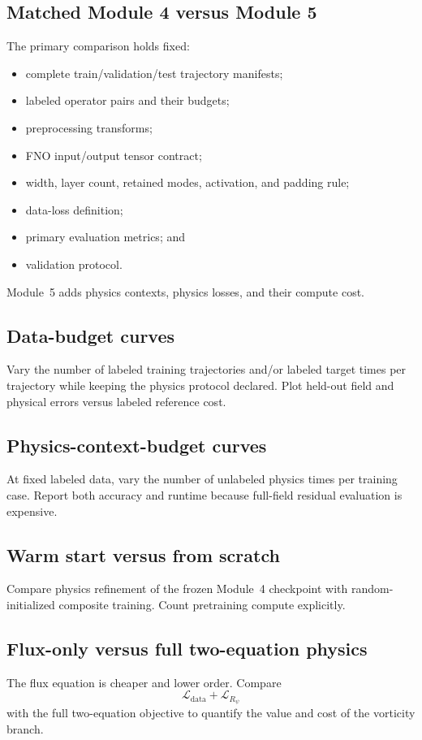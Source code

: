 \documentclass[11pt]{article}
\newcommand{\Ldata}{\mathcal{L}_{\mathrm{data}}}
\begin{document}
\subsection{Matched Module 4 versus Module 5}
The primary comparison holds fixed:
\begin{itemize}
  \item complete train/validation/test trajectory manifests;
  \item labeled operator pairs and their budgets;
  \item preprocessing transforms;
  \item FNO input/output tensor contract;
  \item width, layer count, retained modes, activation, and padding rule;
  \item data-loss definition;
  \item primary evaluation metrics; and
  \item validation protocol.
\end{itemize}
Module~5 adds physics contexts, physics losses, and their compute cost.

\subsection{Data-budget curves}
Vary the number of labeled training trajectories and/or labeled target times per trajectory while keeping the physics protocol declared. Plot held-out field and physical errors versus labeled reference cost.

\subsection{Physics-context-budget curves}
At fixed labeled data, vary the number of unlabeled physics times per training case. Report both accuracy and runtime because full-field residual evaluation is expensive.

\subsection{Warm start versus from scratch}
Compare physics refinement of the frozen Module~4 checkpoint with random-initialized composite training. Count pretraining compute explicitly.

\subsection{Flux-only versus full two-equation physics}
The flux equation is cheaper and lower order. Compare
\begin{equation}
\Ldata+\mathcal{L}_{R_\psi}
\end{equation}
with the full two-equation objective to quantify the value and cost of the vorticity branch.
\end{document}
